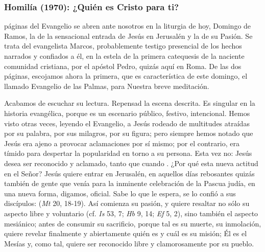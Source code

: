 \subsubsection{Homilía (1970): ¿Quién es Cristo para ti?}


\begin{body}
 páginas del Evangelio se abren ante nosotros en la liturgia de hoy, Domingo de Ramos, la de la sensacional entrada de Jesús en Jerusalén y la de su Pasión. Se trata del evangelista Marcos, probablemente testigo presencial de los hechos narrados y confiados a él, en la estela de la primera catequesis de la naciente comunidad cristiana, por el apóstol Pedro, quizás aquí en Roma. De las dos páginas, escojamos ahora la primera, que es característica de este domingo, el llamado Evangelio de las Palmas, para Nuestra breve meditación.

Acabamos de escuchar su lectura. Repensad la escena descrita. Es singular en la historia evangélica, porque es un escenario público, festivo, intencional. Hemos visto otras veces, leyendo el Evangelio, a Jesús rodeado de multitudes atraídas por su palabra, por sus milagros, por su figura; pero siempre hemos notado que Jesús era ajeno a provocar aclamaciones por sí mismo; por el contrario, era tímido para despertar la popularidad en torno a su persona. Esta vez no: Jesús desea ser reconocido y aclamado, tanto que cuando . ¿Por qué esta nueva actitud en el Señor? Jesús quiere entrar en Jerusalén, en aquellos días rebosantes quizás también de gente que venía para la inminente celebración de la Pascua judía, en una nueva forma, digamos, oficial. Sabe lo que le espera, se lo confió a sus discípulos:  (\textit{Mt} 20, 18-19). Así comienza su pasión, y quiere resaltar no sólo su aspecto libre y voluntario (cf. \textit{Is} 53, 7; \textit{Hb} 9, 14; \textit{Ef} 5, 2), sino también el aspecto mesiánico; antes de consumir su sacrificio, porque tal es su muerte, su inmolación, quiere revelar finalmente y abiertamente quién es y cuál es su misión; Él es el Mesías y, como tal, quiere ser reconocido libre y clamorosamente por su pueblo.


\end{body}
